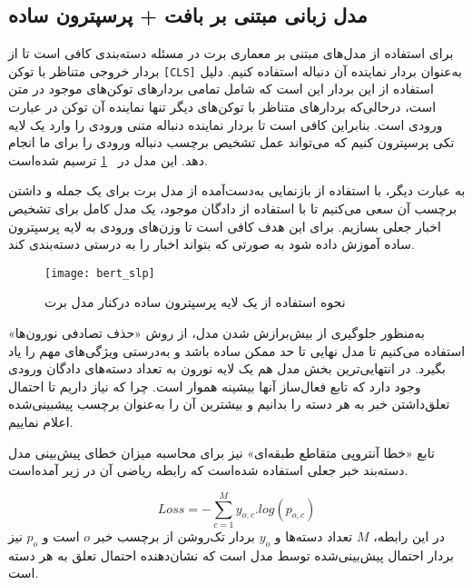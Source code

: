 \subsection{مدل زبانی مبتنی بر بافت + پرسپترون ساده}
برای استفاده از مدل‌‌های مبتنی بر معماری ‌برت در مسئله دسته‌بندی کافی است تا از بردار خروجی متناظر با توکن \verb|[CLS]| به‌عنوان بردار نماینده آن دنباله استفاده کنیم. دلیل استفاده از این بردار این است که شامل تمامی بردارهای توکن‌های موجود در متن است، درحالی‌که بردارهای متناظر با توکن‌های دیگر تنها نماینده آن توکن در عبارت ورودی است. بنابراین کافی است تا بردار نماینده دنباله متنی ورودی را وارد یک لایه تکی پرسپترون کنیم که می‌تواند عمل تشخیص برچسب دنباله ورودی را برای ما انجام دهد. این مدل در \figurename~\ref{fig.bertSLP} ترسیم شده‌است.

به عبارت دیگر، با استفاده از بازنمایی به‌دست‌آمده از مدل برت برای یک جمله و داشتن برچسب آن سعی می‌کنیم تا با استفاده از  دادگان موجود، یک مدل کامل برای تشخیص اخبار جعلی بسازیم. برای این هدف کافی است تا وزن‌های ورودی به لایه پرسپترون  ساده آموزش داده شود به صورتی که بتواند اخبار را به درستی دسته‌بندی کند. 

\begin{figure}[!h]
\texttt{[image: bert\_slp]}
\centering
\caption{نحوه استفاده از یک لایه پرسپترون ساده درکنار مدل برت}
\label{fig.bertSLP}
\end{figure}
\noindent

به‌منظور جلوگیری از بیش‌برازش شدن مدل، از روش «حذف تصادفی نورون‌ها» استفاده می‌کنیم تا مدل نهایی تا حد ممکن ساده باشد و به‌درستی ویژگی‌های مهم را یاد بگیرد. در انتهایی‌ترین بخش مدل هم یک لایه نورون به تعداد دسته‌های دادگان ورودی وجود دارد که تابع فعال‌ساز آنها بیشینه هموار است. چرا که نیاز داریم تا احتمال تعلق‌داشتن خبر به هر دسته را بدانیم و بیشترین آن را به‌عنوان برچسب پیشبینی‌شده اعلام نماییم.

تابع «خطا آنتروپی متقاطع طبقه‌ای» نیز برای محاسبه میزان خطای پیش‌بینی مدل دسته‌بند خبر جعلی استفاده شده‌است که رابطه ریاضی آن در زیر آمده‌است.

\begin{equation}
Loss = - \sum_{c=1}^{M}y_{o,c} . log(p_{o,c})
\end{equation}
در این رابطه، $M$ تعداد دسته‌ها و $y_o$ بردار تک‌روشن از برچسب خبر $o$ است و $p_o$ نیز بردار احتمال پیش‌بینی‌شده توسط مدل است که نشان‌دهنده احتمال تعلق به هر دسته است.


